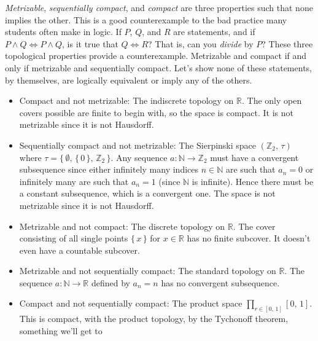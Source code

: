 \documentclass{article}
\theoremstyle{plain}
\theoremstyle{normal}
\begin{document}
        \textit{Metrizable}, \textit{sequentially compact}, and
        \textit{compact} are three properties such that none implies the other.
        This is a good counterexample to the bad practice many students often
        make in logic. If $P$, $Q$, and $R$ are statements, and if
        $P\land{Q}\Leftrightarrow{P}\land{Q}$, is it true that
        $Q\Leftrightarrow{R}$? That is, can you \textit{divide} by $P$?
        These three topological properties provide a
        counterexample. Metrizable and compact if and only if metrizable and
        sequentially compact. Let's show none of these statements, by
        themselves, are logically equivalent or imply any of the others.
        \begin{itemize}
            \item Compact and not metrizable: The indiscrete topology on
                $\mathbb{R}$. The only open covers possible are finite to begin
                with, so the space is compact. It is not metrizable since it
                is not Hausdorff.
            \item Sequentially compact and not metrizable: The
                Sierpinski space $(\mathbb{Z}_{2},\,\tau)$ where
                $\tau=\big\{\,\emptyset,\,\{\,0\,\},\,\mathbb{Z}_{2}\,\big\}$.
                Any sequence $a:\mathbb{N}\rightarrow\mathbb{Z}_{2}$ must have
                a convergent subsequence since either infinitely many indices
                $n\in\mathbb{N}$ are such that $a_{n}=0$ or infinitely many are
                such that $a_{n}=1$ (since $\mathbb{N}$ is infinite). Hence
                there must be a constant subsequence, which is a convergent
                one. The space is not metrizable since it is not Hausdorff.
            \item Metrizable and not compact: The discrete topology on
                $\mathbb{R}$. The cover consisting of all single points
                $\{\,x\,\}$ for $x\in\mathbb{R}$ has no finite subcover. It
                doesn't even have a countable subcover.
            \item Metrizable and not sequentially compact: The standard topology
                on $\mathbb{R}$. The sequence
                $a:\mathbb{N}\rightarrow\mathbb{R}$ defined by $a_{n}=n$ has no
                convergent subsequence.
            \item Compact and not sequentially compact: The product space
                $\prod_{r\in[0,\,1]}[0,\,1]$. This is compact, with the product
                topology, by the Tychonoff theorem, something we'll get to

\end{itemize}
\end{document}
